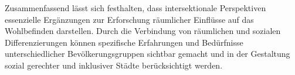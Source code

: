 Zusammenfassend lässt sich festhalten, dass intersektionale Perspektiven essenzielle Ergänzungen zur Erforschung räumlicher Einflüsse auf das Wohlbefinden darstellen. Durch die Verbindung von räumlichen und sozialen Differenzierungen können spezifische Erfahrungen und Bedürfnisse unterschiedlicher Bevölkerungsgruppen sichtbar gemacht und in der Gestaltung sozial gerechter und inklusiver Städte berücksichtigt werden.

